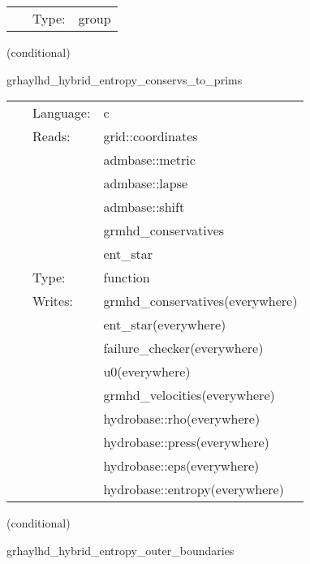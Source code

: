  \begin{tabular*}{160mm}{cll} 
~ & Type:  & group \\ 
\end{tabular*} 


\vspace{5mm}

   (conditional) 

\hspace{5mm} grhaylhd\_hybrid\_entropy\_conservs\_to\_prims 

\hspace{5mm}{\it entropy+hybrid version of grhaylhd\_conservs\_to\_prims } 


\hspace{5mm}

 \begin{tabular*}{160mm}{cll} 
~ & Language:  & c \\ 
~ & Reads:  & grid::coordinates \\ 
~& ~ &admbase::metric\\ 
~& ~ &admbase::lapse\\ 
~& ~ &admbase::shift\\ 
~& ~ &grmhd\_conservatives\\ 
~& ~ &ent\_star\\ 
~ & Type:  & function \\ 
~ & Writes:  & grmhd\_conservatives(everywhere) \\ 
~& ~ &ent\_star(everywhere)\\ 
~& ~ &failure\_checker(everywhere)\\ 
~& ~ &u0(everywhere)\\ 
~& ~ &grmhd\_velocities(everywhere)\\ 
~& ~ &hydrobase::rho(everywhere)\\ 
~& ~ &hydrobase::press(everywhere)\\ 
~& ~ &hydrobase::eps(everywhere)\\ 
~& ~ &hydrobase::entropy(everywhere)\\ 
\end{tabular*} 


\vspace{5mm}

   (conditional) 

\hspace{5mm} grhaylhd\_hybrid\_entropy\_outer\_boundaries 

\hspace{5mm}{\it entropy+hybrid version of grhaylhd\_outer\_boundaries } 


